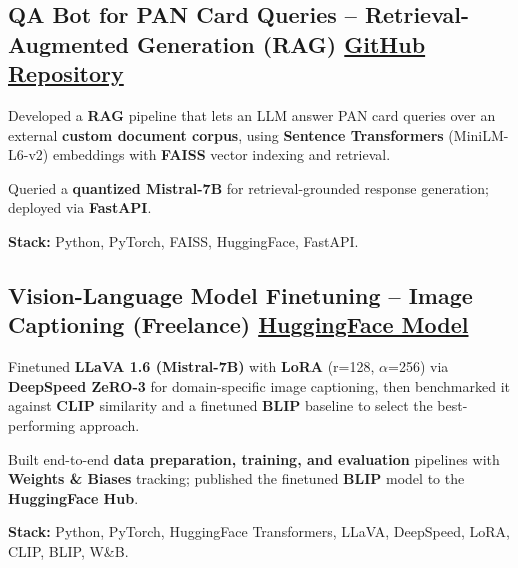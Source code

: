 \documentclass[letter,10pt]{article}
\begin{document}
\subsection{QA Bot for PAN Card Queries -- Retrieval-Augmented Generation (RAG) \hfill \href{https://github.com/sunil448832/Natural-Language-Processing/tree/master/RAG(Retrieval\%20Augment\%20Generation)}{GitHub Repository}}
\begin{zitemize}
\item Developed a \textbf{RAG} pipeline that lets an LLM answer PAN card queries over an external \textbf{custom document corpus}, using \textbf{Sentence Transformers} (MiniLM-L6-v2) embeddings with \textbf{FAISS} vector indexing and retrieval.
\item Queried a \textbf{quantized Mistral-7B} for retrieval-grounded response generation; deployed via \textbf{FastAPI}.
\item \textbf{Stack:} Python, PyTorch, FAISS, HuggingFace, FastAPI.
\end{zitemize}

\subsection{Vision-Language Model Finetuning -- Image Captioning (Freelance) \hfill \href{https://huggingface.co/sunil448832/blip-model}{HuggingFace Model}}
\begin{zitemize}
\item Finetuned \textbf{LLaVA 1.6 (Mistral-7B)} with \textbf{LoRA} (r=128, $\alpha$=256) via \textbf{DeepSpeed ZeRO-3} for domain-specific image captioning, then benchmarked it against \textbf{CLIP} similarity and a finetuned \textbf{BLIP} baseline to select the best-performing approach.
\item Built end-to-end \textbf{data preparation, training, and evaluation} pipelines with \textbf{Weights \& Biases} tracking; published the finetuned \textbf{BLIP} model to the \textbf{HuggingFace Hub}.
\item \textbf{Stack:} Python, PyTorch, HuggingFace Transformers, LLaVA, DeepSpeed, LoRA, CLIP, BLIP, W\&B.
\end{zitemize}
\end{document}
